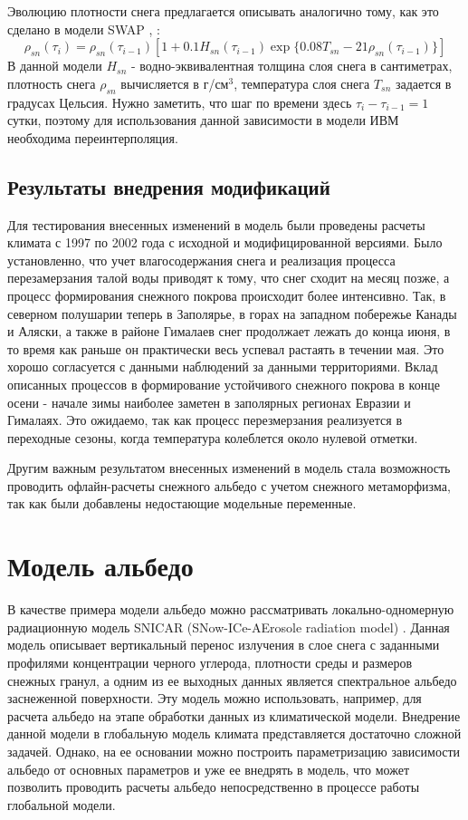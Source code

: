 \documentclass[a4paper, fontsize=14pt]{scrartcl}
\begin{document}
Эволюцию плотности снега предлагается описывать аналогично тому, как это сделано в модели SWAP \cite{Gusev2002}, \cite{YOSIDA1955}:
\begin{equation}
    \rho_{sn}(\tau_i) = \rho_{sn}(\tau_{i-1}) \left[  1 + 0.1 H_{sn}(\tau_{i-1}) \exp \{ 0.08 T_{sn} - 21 \rho_{sn}(\tau_{i-1})  \} \right]    \label{sys}  
\end{equation}
В данной модели $H_{sn}$ - водно-эквивалентная толщина слоя снега в сантиметрах, плотность снега $\rho_{sn}$ вычисляется в г/см$^3$, температура слоя снега $T_{sn}$ задается в градусах Цельсия. Нужно заметить, что шаг по времени здесь $\tau_{i} - \tau_{i-1} = 1$ сутки, поэтому для использования данной зависимости в модели ИВМ необходима переинтерполяция.


\subsection{Результаты внедрения модификаций}


Для тестирования внесенных изменений в модель были проведены расчеты климата с 1997 по 2002 года с исходной и модифицированной версиями. Было установленно, что учет влагосодержания снега и реализация процесса перезамерзания талой воды приводят к тому, что снег сходит на месяц позже, а процесс формирования снежного покрова происходит более интенсивно. Так, в северном полушарии теперь в Заполярье, в горах на западном побережье Канады и Аляски, а также в районе Гималаев снег продолжает лежать до конца июня, в то время как раньше он практически весь успевал растаять в течении мая. Это хорошо согласуется с данными наблюдений за данными территориями. Вклад описанных процессов в формирование устойчивого снежного покрова в конце осени - начале зимы наиболее заметен в заполярных регионах Евразии и Гималаях. Это ожидаемо, так как процесс перезмерзания реализуется в переходные сезоны, когда температура колеблется около нулевой отметки.

Другим важным результатом внесенных изменений в модель стала возможность проводить офлайн-расчеты снежного альбедо с учетом снежного метаморфизма, так как были добавлены недостающие модельные переменные.


\newpage
\section{Модель альбедо}


В качестве примера модели альбедо можно рассматривать локально-одномерную радиационную модель SNICAR (SNow-ICe-AErosole radiation model) \cite{Flanner2007}. Данная модель описывает вертикальный перенос излучения в слое снега с заданными профилями концентрации черного углерода, плотности среды и размеров снежных гранул, а одним из ее выходных данных является спектральное альбедо заснеженной поверхности. Эту модель можно использовать, например, для расчета альбедо на этапе обработки данных из климатической модели. Внедрение данной модели в глобальную модель климата представляется достаточно сложной задачей. Однако, на ее основании можно построить параметризацию зависимости альбедо от основных параметров и уже ее внедрять в модель, что может позволить проводить расчеты альбедо непосредственно в процессе работы глобальной модели.
\end{document}
